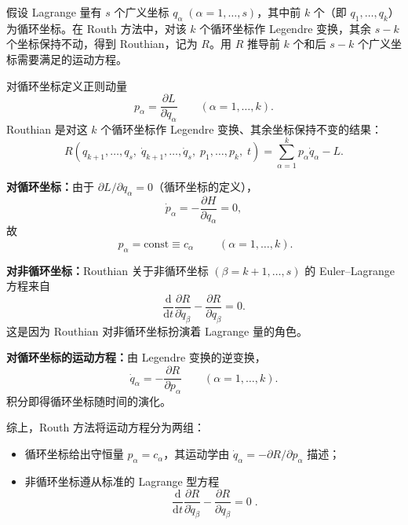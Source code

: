 \begin{question}
假设 Lagrange 量有 \(s\) 个广义坐标 \(q_\alpha\;(\alpha=1,\dots,s)\)，其中前 \(k\) 个（即 \(q_1,\dots,q_k\)）为循环坐标。在 Routh 方法中，对该 \(k\) 个循环坐标作 Legendre 变换，其余 \(s-k\) 个坐标保持不动，得到 Routhian，记为 \(R\)。用 \(R\) 推导前 \(k\) 个和后 \(s-k\) 个广义坐标需要满足的运动方程。

\begin{solution}
对循环坐标定义正则动量
\[
p_\alpha = \frac{\partial L}{\partial\dot q_\alpha} \qquad (\alpha = 1,\dots,k).
\]
Routhian 是对这 \(k\) 个循环坐标作 Legendre 变换、其余坐标保持不变的结果：
\[
R(q_{k+1},\dots,q_s,\;\dot q_{k+1},\dots,\dot q_s,\;p_1,\dots,p_k,\;t)
= \sum_{\alpha=1}^{k} p_\alpha\dot q_\alpha - L .
\]

\textbf{对循环坐标：}由于 \(\partial L/\partial q_\alpha = 0\)（循环坐标的定义），
\[
\dot p_\alpha = -\frac{\partial H}{\partial q_\alpha} = 0,
\]
故
\[
\boxed{\;p_\alpha = \text{const} \equiv c_\alpha\;} \qquad (\alpha=1,\dots,k).
\]

\textbf{对非循环坐标：}Routhian 关于非循环坐标 \((\beta = k+1,\dots,s)\) 的 Euler--Lagrange 方程来自
\[
\frac{\mathrm d}{\mathrm d t}\frac{\partial R}{\partial\dot q_\beta}
- \frac{\partial R}{\partial q_\beta} = 0 .
\]
这是因为 Routhian 对非循环坐标扮演着 Lagrange 量的角色。

\textbf{对循环坐标的运动方程：}由 Legendre 变换的逆变换，
\[
\dot q_\alpha = -\frac{\partial R}{\partial p_\alpha} \qquad (\alpha=1,\dots,k).
\]
积分即得循环坐标随时间的演化。

综上，Routh 方法将运动方程分为两组：
\begin{itemize}
  \item 循环坐标给出守恒量 \(p_\alpha = c_\alpha\)，其运动学由 \(\dot q_\alpha = -\partial R/\partial p_\alpha\) 描述；
  \item 非循环坐标遵从标准的 Lagrange 型方程
  \[
  \boxed{\;\frac{\mathrm d}{\mathrm d t}\frac{\partial R}{\partial\dot q_\beta}
  - \frac{\partial R}{\partial q_\beta} = 0\;}.
  \]
\end{itemize}
\end{solution}
\end{question}


